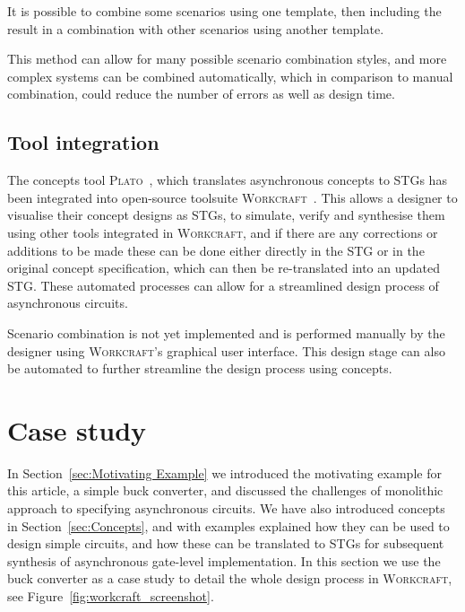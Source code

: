 \documentclass[british, journal]{IEEEtran}
\newcommand{\noun}[1]{\textsc{#1}}
\begin{document}
It is possible to combine some scenarios using one template, then including
the result in a combination with other scenarios using another template.

This method can allow for many possible scenario combination
styles, and more complex systems can be combined automatically, which
in comparison to manual combination, could reduce the number of errors
as well as design time.

\subsection{Tool integration}

The concepts tool \textsc{Plato}~\cite{2016_concepts_github}, which translates
asynchronous concepts to STGs has been integrated into open-source
toolsuite \noun{Workcraft}~\cite{Workcraft_website}.
This allows a designer to visualise their concept designs as STGs, to simulate,
verify and synthesise them using other tools integrated in \noun{Workcraft},
and if there are any corrections or additions to be made these can be done either
directly in the STG or in the original concept specification, which can then
be re-translated into an updated STG. These automated processes can allow for a streamlined design process of asynchronous circuits.

Scenario combination is not yet implemented and is performed manually by
the designer using \noun{Workcraft}'s graphical user interface. This
design stage can also be automated to further streamline the design process
using concepts.

\vspace{-1mm}
\section{Case study\label{sec:case-study}}

In Section~\ref{sec:Motivating Example} we introduced the motivating example for
this article, a simple buck converter, and discussed the challenges of monolithic
approach to specifying asynchronous circuits. We have also introduced
concepts in Section~\ref{sec:Concepts}, and with examples explained how they can
be used to design simple circuits, and how these can be translated to STGs
for subsequent synthesis of asynchronous gate-level implementation.
In this section we use the buck converter as a case study to detail the
whole design process in \noun{Workcraft}, see Figure~\ref{fig:workcraft_screenshot}.
\end{document}
